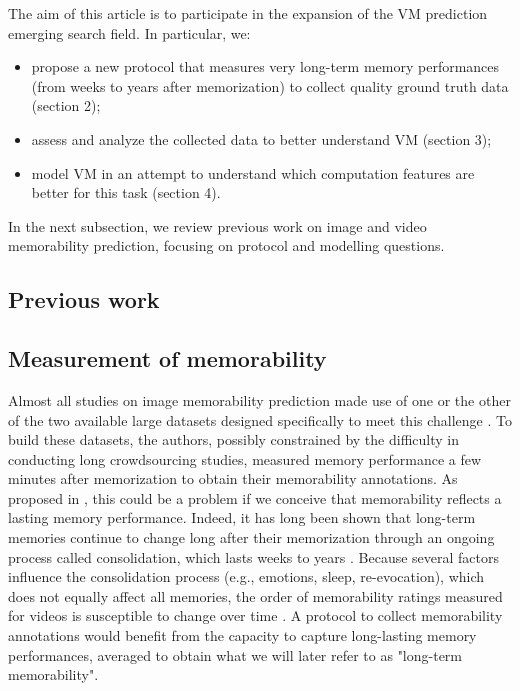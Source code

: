 \documentclass[sigconf]{acmart}
\begin{document}
The aim of this article is to participate in the expansion of the VM prediction emerging search field.
In particular, we:
\begin{itemize}
	\item propose a new protocol that measures very long-term memory performances (from weeks to years after memorization) to collect quality ground truth data (section 2);
	\item assess and analyze the collected data to better understand VM (section 3);
	\item model VM in an attempt to understand which computation features are better for this task (section 4).
\end{itemize}
In the next subsection, we review previous work on image and video memorability prediction, focusing on protocol and modelling questions.

\subsection*{Previous work}
\subsection{Measurement of memorability}
Almost all studies on image memorability prediction made use of one or the other of the two available large datasets designed specifically to meet this challenge \cite{isola_2011_makes,khosla_2015_understanding}.
To build these datasets, the authors, possibly constrained by the difficulty in conducting long crowdsourcing studies, measured memory performance a few minutes after memorization to obtain their memorability annotations.
As proposed in \cite{cohendet_2016_prediction}, this could be a problem if we conceive that memorability reflects a lasting memory performance.
Indeed, it has long been shown that long-term memories continue to change long after their memorization through an ongoing process called consolidation, which lasts weeks to years \cite{mcgaugh_2000_memory}.
Because several factors influence the consolidation process (e.g., emotions, sleep, re-evocation), which does not equally affect all memories, the order of memorability ratings measured for videos is susceptible to change over time \cite{cohendet_2016_prediction}.
A protocol to collect memorability annotations would benefit from the capacity to capture long-lasting memory performances, averaged to obtain what we will later refer to as "long-term memorability".
\end{document}
